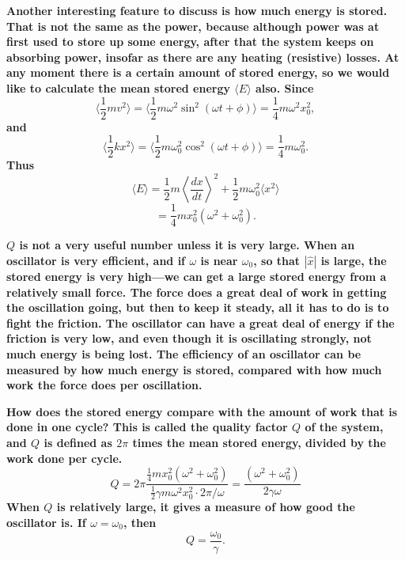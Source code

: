\documentclass[]{revtex4}
\newcommand{\st}[1]{{\color{red}\bfseries #1}}
\begin{document}
\st{
  Another interesting feature to discuss is how much energy is stored. That is not the same as the power, because although power was at first used to store up some energy, after that the system keeps on absorbing power, insofar as there are any heating (resistive) losses. At any moment there is a certain amount of stored energy, so we would like to calculate the mean stored energy $\langle E \rangle$ also.
  Since
  \begin{equation*}
    \bigg\langle \frac{ 1 }{ 2 } m v^2 \bigg\rangle = 
    \bigg\langle \frac{ 1 }{ 2 } m \omega^2 \sin^2 (\omega t + \phi) \bigg\rangle = 
    \frac{ 1 }{ 4 } m \omega^2 x_0^2,
  \end{equation*}
  and 
  \begin{equation*}
  \bigg\langle \frac{ 1 }{ 2 } k x^2 \bigg\rangle = 
  \bigg\langle \frac{ 1 }{ 2 } m \omega_0^2 \cos^2 (\omega t + \phi) \bigg\rangle =
  \frac{ 1 }{ 4 } m \omega_0^2.
  \end{equation*}
Thus
}
\[\langle E\rangle = \frac{1}{2}m\left\langle\frac{dx}{dt}\right\rangle^2+\frac{1}{2}m\omega_0^2\langle x^2\rangle\]
\[=\frac{1}{4}mx_0^2(\omega^2+\omega_0^2).\]

\st{
$Q$ is not a very useful number unless it is very large.
When an oscillator is very efficient, and if $\omega$ is near $\omega_0$, so that 
$| \hat{x} |$ is large, the stored energy is very high—we can get a large stored energy from a relatively small force. The force does a great deal of work in getting the oscillation going, but then to keep it steady, all it has to do is to fight the friction. The oscillator can have a great deal of energy if the friction is very low, and even though it is oscillating strongly, not much energy is being lost. The efficiency of an oscillator can be measured by how much energy is stored, compared with how much work the force does per oscillation.
}

\st{
How does the stored energy compare with the amount of work that is done in one cycle? This is called the quality factor $Q$ of the system, and $Q$ is defined as $2\pi$ times the mean stored energy, divided by the work done per cycle.
}
\[Q = 2\pi\frac{\frac{1}{4}mx_0^2(\omega^2+\omega_0^2)}{\frac{1}{2}\gamma m\omega^2x_0^2\cdot 2\pi/\omega}=\frac{(\omega^2+\omega_0^2)}{2\gamma \omega}\]
\st{
When $Q$ is relatively large, it gives a measure of how good the oscillator is.
If $\omega = \omega_0$, then 
\begin{equation*}
    Q = \frac{ \omega_0 }{ \gamma }.
\end{equation*}
}
\end{document}
